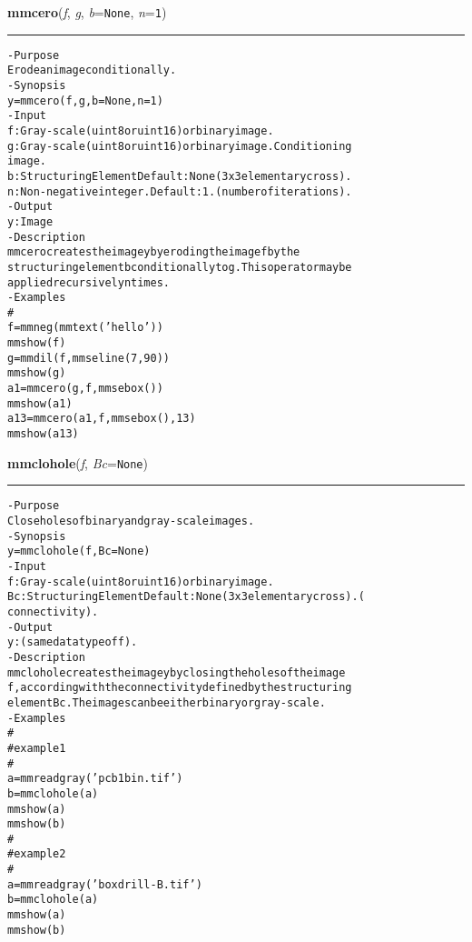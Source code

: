     \begin{boxedminipage}{\textwidth}

    \raggedright \textbf{mmcero}(\textit{f}, \textit{g}, \textit{b}=\texttt{N\-o\-n\-e\-}, \textit{n}=\texttt{1\-})

    \vspace{-1.5ex}

    \rule{\textwidth}{0.5\fboxrule}
\begin{alltt}
- Purpose
    Erode an image conditionally.
- Synopsis
    y = mmcero(f, g, b=None, n=1)
- Input
    f: Gray-scale (uint8 or uint16) or binary image.
    g: Gray-scale (uint8 or uint16) or binary image. Conditioning
       image.
    b: Structuring Element Default: None (3x3 elementary cross).
    n: Non-negative integer. Default: 1. (number of iterations).
- Output
    y: Image
- Description
    mmcero creates the image y by eroding the image f by the
    structuring element b conditionally to g . This operator may be
    applied recursively n times.
- Examples
    \#
    f = mmneg(mmtext('hello'))
    mmshow(f)
    g = mmdil(f,mmseline(7,90))
    mmshow(g)
    a1=mmcero(g,f,mmsebox())
    mmshow(a1)
    a13=mmcero(a1,f,mmsebox(),13)
    mmshow(a13)\end{alltt}

    \vspace{1ex}

    \end{boxedminipage}

    \label{multireg:num_pymorph:mmclohole}
    \vspace{0.5ex}

    \begin{boxedminipage}{\textwidth}

    \raggedright \textbf{mmclohole}(\textit{f}, \textit{Bc}=\texttt{N\-o\-n\-e\-})

    \vspace{-1.5ex}

    \rule{\textwidth}{0.5\fboxrule}
\begin{alltt}
- Purpose
    Close holes of binary and gray-scale images.
- Synopsis
    y = mmclohole(f, Bc=None)
- Input
    f:  Gray-scale (uint8 or uint16) or binary image.
    Bc: Structuring Element Default: None (3x3 elementary cross). (
        connectivity).
- Output
    y: (same datatype of f ).
- Description
    mmclohole creates the image y by closing the holes of the image
    f , according with the connectivity defined by the structuring
    element Bc .The images can be either binary or gray-scale.
- Examples
    \#
    \#   example 1
    \#
    a = mmreadgray('pcb1bin.tif')
    b = mmclohole(a)
    mmshow(a)
    mmshow(b)
    \#
    \#   example 2
    \#
    a = mmreadgray('boxdrill-B.tif')
    b = mmclohole(a)
    mmshow(a)
    mmshow(b)\end{alltt}

    \vspace{1ex}

    \end{boxedminipage}

